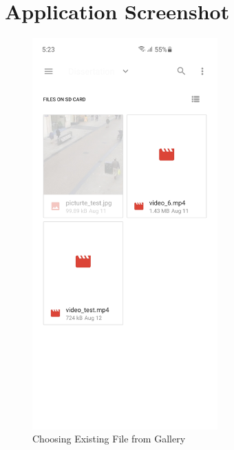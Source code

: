 \chapter{Application Screenshot}\label{intro}

    \begin{figure}[!ht]
        \centering
        \includegraphics[width=2.8in]{images/appendix-a/sh-choosing.jpg}
        \caption{Choosing Existing File from Gallery}
        \label{appendix:result}
    \end{figure}

